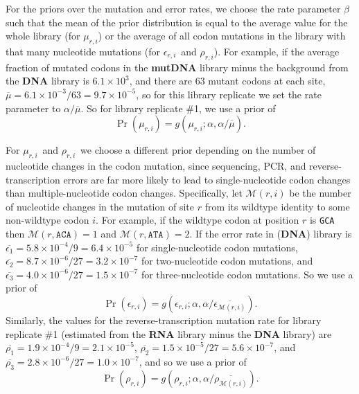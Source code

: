 \documentclass[10pt]{article}
\newcommand{\eri}{\mbox{$\epsilon_{r,i}$}}
\newcommand{\rri}{\mbox{$\rho_{r,i}$}}
\newcommand{\mri}{\mbox{$\mu_{r,i}$}}
\begin{document}
For the priors over the mutation and error rates, we choose the rate parameter $\beta$ such that the mean of the prior distribution is equal to the average value for the whole library (for \mri) or the average of all codon mutations in the library with that many nucleotide mutations (for \eri\ and \rri). For example, if the average fraction of mutated codons in the {\bf mutDNA} library minus the background from the {\bf DNA} library is $6.1 \times 10^{3}$, and there are 63 mutant codons at each site, $\overline{\mu} = 6.1 \times 10^{-3} / 63 = 9.7 \times 10^{-5}$, so for this library replicate we set the rate parameter to $\alpha / \overline{\mu}$. So for library replicate \#1, we use a prior of
\begin{equation}
\Pr\left(\mri\right) = g\left(\mri; \alpha, \alpha / \overline{\mu}\right).
\end{equation}

For \mri\ and \rri\ we choose a different prior depending on the number of nucleotide changes in the codon mutation, since sequencing, PCR, and reverse-transcription errors are far more likely to lead to single-nucleotide codon changes than multiple-nucleotide codon changes. Specifically, let $\mathcal{M}\left(r, i\right)$ be the number of nucleotide changes in the mutation of site $r$ from its wildtype identity to some non-wildtype codon $i$. For example, if the wildtype codon at position $r$ is \texttt{GCA} then $\mathcal{M}\left(r, \texttt{ACA}\right) = 1$ and $\mathcal{M}\left(r, \texttt{ATA}\right) = 2$. If the error rate in ({\bf DNA}) library is $\overline{\epsilon_1} = 5.8\times 10^{-4} / 9 = 6.4\times 10^{-5}$ for single-nucleotide codon mutations, $\overline{\epsilon_2} = 8.7\times 10^{-6} / 27 = 3.2\times 10^{-7}$ for two-nucleotide codon mutations, and $\overline{\epsilon_3} = 4.0\times 10^{-6} / 27 = 1.5\times 10^{-7}$ for three-nucleotide codon mutations. So we use a prior of
\begin{equation}
\Pr\left(\eri\right) = g\left(\eri; \alpha, \alpha / \overline{\epsilon_{\mathcal{M}\left(r, i\right)}}\right).
\end{equation}
Similarly, the values for the reverse-transcription mutation rate for library replicate \#1 (estimated from the {\bf RNA} library minus the {\bf DNA} library) are $\overline{\rho_1} = 1.9 \times 10^{-4} / 9 = 2.1\times 10^{-5}$, $\overline{\rho_2} = 1.5 \times 10^{-5} / 27 = 5.6\times 10^{-7}$, and $\overline{\rho_3} = 2.8 \times 10^{-6} / 27 = 1.0 \times 10^{-7}$, and so we use a prior of
\begin{equation}
\Pr\left(\rri\right) = g\left(\rri; \alpha, \alpha / \overline{\rho_{\mathcal{M}\left(r, i\right)}}\right).
\end{equation}
\end{document}
